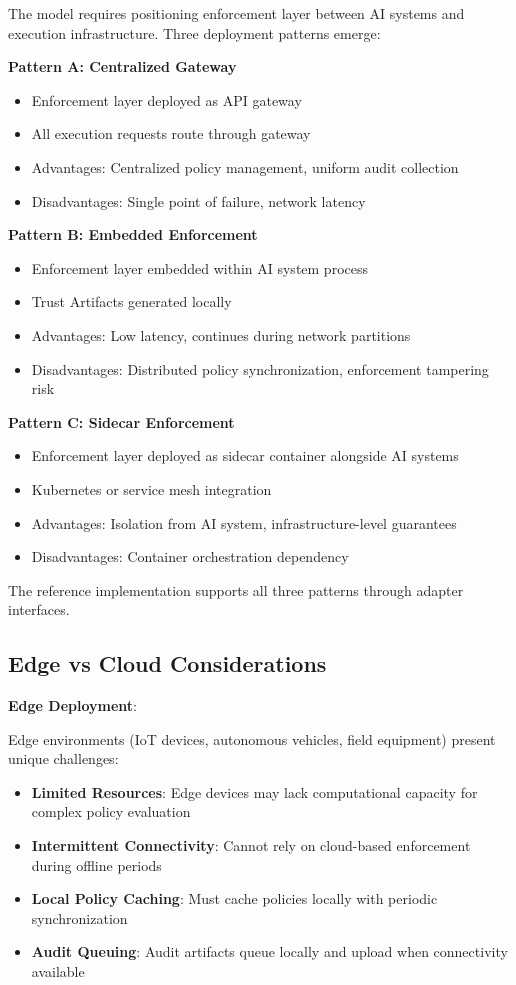 \documentclass[11pt,letterpaper]{article}
\begin{document}
The model requires positioning enforcement layer between AI systems and execution infrastructure. Three deployment patterns emerge:

\textbf{Pattern A: Centralized Gateway}
\begin{itemize}
\item Enforcement layer deployed as API gateway
\item All execution requests route through gateway
\item Advantages: Centralized policy management, uniform audit collection
\item Disadvantages: Single point of failure, network latency
\end{itemize}

\textbf{Pattern B: Embedded Enforcement}
\begin{itemize}
\item Enforcement layer embedded within AI system process
\item Trust Artifacts generated locally
\item Advantages: Low latency, continues during network partitions
\item Disadvantages: Distributed policy synchronization, enforcement tampering risk
\end{itemize}

\textbf{Pattern C: Sidecar Enforcement}
\begin{itemize}
\item Enforcement layer deployed as sidecar container alongside AI systems
\item Kubernetes or service mesh integration
\item Advantages: Isolation from AI system, infrastructure-level guarantees
\item Disadvantages: Container orchestration dependency
\end{itemize}

The reference implementation supports all three patterns through adapter interfaces.

\subsection{Edge vs Cloud Considerations}

\textbf{Edge Deployment}:

Edge environments (IoT devices, autonomous vehicles, field equipment) present unique challenges:

\begin{itemize}
\item \textbf{Limited Resources}: Edge devices may lack computational capacity for complex policy evaluation
\item \textbf{Intermittent Connectivity}: Cannot rely on cloud-based enforcement during offline periods
\item \textbf{Local Policy Caching}: Must cache policies locally with periodic synchronization
\item \textbf{Audit Queuing}: Audit artifacts queue locally and upload when connectivity available
\end{itemize}
\end{document}
